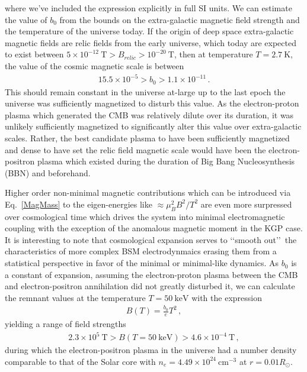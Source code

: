 \documentclass[Universe,article,submit,moreauthors,pdftex]{Definitions/mdpi}
\newcommand*{\req}[1]{Eq.~{\eqref{#1}}}
\begin{document}
where we've included the expression explicitly in full SI units. We can estimate the value of $b_{0}$ from the bounds on the extra-galactic magnetic field strength and the temperature of the universe today.  If the origin of deep space extra-galactic magnetic fields are relic fields from the early universe, which today are expected to exist between $5\times10^{-12}\ \mathrm{T}>B_{relic}>10^{-20}\ \mathrm{T}$, then at temperature $T=2.7\ \mathrm{K}$, the value of the cosmic magnetic scale is between
\begin{alignat}{1}
    \label{BoScale} 5.5\times10^{-5}>b_{0}>1.1\times10^{-11}\,.
\end{alignat}
This should remain constant in the universe at-large up to the last epoch the universe was sufficiently magnetized to disturb this value. As the electron-proton plasma which generated the CMB was relatively dilute over its duration, it was unlikely sufficiently magnetized to significantly alter this value over extra-galactic scales. Rather, the best candidate plasma to have been sufficiently magnetized and dense to have set the relic field magnetic scale would have been the electron-positron plasma which existed during the duration of Big Bang Nucleosynthesis (BBN) and beforehand.

Higher order non-minimal magnetic contributions which can be introduced via \req{MagMass} to the eigen-energies like $\approx\mu_{B}^{2}B^{2}/T^{2}$ are even more surpressed over cosmological time which drives the system into minimal electromagnetic coupling with the exception of the anomalous magnetic moment in the KGP case. It is interesting to note that cosmological expansion serves to \lq\lq smooth out\rq\rq\ the characteristics of more complex BSM electrodynmaics erasing them from a statistical perspective in favor of the minimal or minimal-like dynamics. As $b_0$ is a constant of expansion, assuming the electron-proton plasma between the CMB and electron-positron annihilation did not greatly disturbed it, we can calculate the remnant values at the temperature $T=50\ \mathrm{keV}$ with the expression
\begin{align}
  \label{BBNFields} B(T)=\frac{b_{0}}{e}T^{2}\,,
\end{align}
yielding a range of field strengths
\begin{align}
  \label{BBNRange} 2.3\times10^{5}\ \mathrm{T}>B(T=50\ \mathrm{keV})>4.6\times10^{-4}\ \mathrm{T}\,,
\end{align}
during which the electron-positron plasma in the universe had a number density comparable to that of the Solar core with $n_{e}=4.49\times10^{24}\ \mathrm{cm}^{-3}$ at $r=0.01R_{\odot}$.
\end{document}
